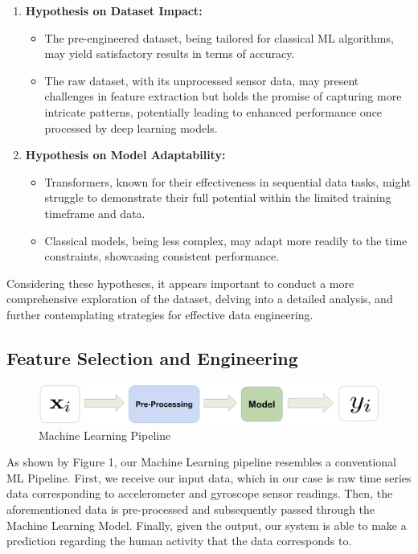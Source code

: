 \documentclass[conference]{IEEEtran}
\begin{document}
\begin{enumerate}

  \item \textbf{Hypothesis on Dataset Impact:}
   \begin{itemize}
      \item The pre-engineered dataset, being tailored for classical ML algorithms, may yield satisfactory results in terms of accuracy.
      \item The raw dataset, with its unprocessed sensor data, may present challenges in feature extraction but holds the promise of capturing more intricate patterns, potentially leading to enhanced performance once processed by deep learning models.
   \end{itemize}

  \item \textbf{Hypothesis on Model Adaptability:}
   \begin{itemize}
      \item Transformers, known for their effectiveness in sequential data tasks, might struggle to demonstrate their full potential within the limited training timeframe and data.
      \item Classical models, being less complex, may adapt more readily to the time constraints, showcasing consistent performance.
   \end{itemize}

\end{enumerate}

Considering these hypotheses, it appears important to conduct a more comprehensive exploration of the dataset, delving into a detailed analysis, and further contemplating strategies for effective data engineering.

\subsection{Feature Selection and Engineering}

\begin{figure}[h!]
	\includegraphics[width= 0.9 \linewidth]{ML Pipeline.png}
	\centering
	\caption{Machine Learning Pipeline}
	\label{ML Pipeline.png}
\end{figure}

As shown by Figure 1, our Machine Learning pipeline resembles a conventional ML Pipeline. First, we receive our input data, which in our case is raw time series data corresponding to accelerometer and gyroscope sensor readings. Then, the aforementioned data is pre-processed and subsequently passed through the Machine Learning Model. Finally, given the output, our system is able to make a prediction regarding the human activity that the data corresponds to. 
\end{document}
